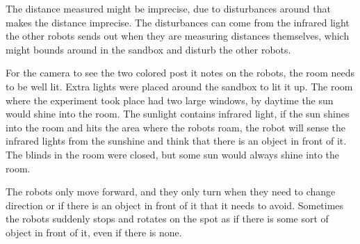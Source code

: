 The distance measured might be imprecise, due to disturbances around that makes the distance imprecise. The disturbances can come from the infrared light the other robots sends out when they are measuring distances themselves, which might bounds around in the sandbox and disturb the other robots.

For the camera to see the two colored post it notes on the robots, the room needs to be well lit. Extra lights were placed around the sandbox to lit it up. The room where the experiment took place had two large windows, by daytime the sun would shine into the room. The sunlight contains infrared light, if the sun shines into the room and hits the area where the robots roam, the robot will sense the infrared lights from the sunshine and think that there is an object in front of it. The blinds in the room were closed, but some sun would always shine into the room.

The robots only move forward, and they only turn when they need to change direction or if there is an object in front of it that it needs to avoid. Sometimes the robots suddenly stops and rotates on the spot as if there is some sort of object in front of it, even if there is none.